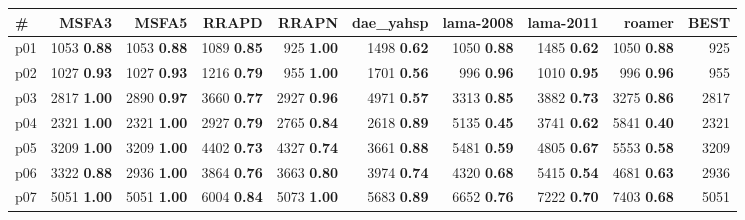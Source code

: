 \begin{tabular}{|l|rrrrrrrr|r|}
\hline
\textbf{\#} & \textbf{MSFA3} & \textbf{MSFA5} & \textbf{RRAPD} & \textbf{RRAPN} & \textbf{dae\_yahsp} & \textbf{lama-2008} & \textbf{lama-2011} & \textbf{roamer} & \textbf{BEST}\\
\hline
p01 & {\footnotesize 1053} \textbf{0.88} & {\footnotesize 1053} \textbf{0.88} & {\footnotesize 1089} \textbf{0.85} & {\footnotesize 925} \textbf{1.00} & {\footnotesize 1498} \textbf{0.62} & {\footnotesize 1050} \textbf{0.88} & {\footnotesize 1485} \textbf{0.62} & {\footnotesize 1050} \textbf{0.88} & 925\\
p02 & {\footnotesize 1027} \textbf{0.93} & {\footnotesize 1027} \textbf{0.93} & {\footnotesize 1216} \textbf{0.79} & {\footnotesize 955} \textbf{1.00} & {\footnotesize 1701} \textbf{0.56} & {\footnotesize 996} \textbf{0.96} & {\footnotesize 1010} \textbf{0.95} & {\footnotesize 996} \textbf{0.96} & 955\\
p03 & {\footnotesize 2817} \textbf{1.00} & {\footnotesize 2890} \textbf{0.97} & {\footnotesize 3660} \textbf{0.77} & {\footnotesize 2927} \textbf{0.96} & {\footnotesize 4971} \textbf{0.57} & {\footnotesize 3313} \textbf{0.85} & {\footnotesize 3882} \textbf{0.73} & {\footnotesize 3275} \textbf{0.86} & 2817\\
p04 & {\footnotesize 2321} \textbf{1.00} & {\footnotesize 2321} \textbf{1.00} & {\footnotesize 2927} \textbf{0.79} & {\footnotesize 2765} \textbf{0.84} & {\footnotesize 2618} \textbf{0.89} & {\footnotesize 5135} \textbf{0.45} & {\footnotesize 3741} \textbf{0.62} & {\footnotesize 5841} \textbf{0.40} & 2321\\
p05 & {\footnotesize 3209} \textbf{1.00} & {\footnotesize 3209} \textbf{1.00} & {\footnotesize 4402} \textbf{0.73} & {\footnotesize 4327} \textbf{0.74} & {\footnotesize 3661} \textbf{0.88} & {\footnotesize 5481} \textbf{0.59} & {\footnotesize 4805} \textbf{0.67} & {\footnotesize 5553} \textbf{0.58} & 3209\\
p06 & {\footnotesize 3322} \textbf{0.88} & {\footnotesize 2936} \textbf{1.00} & {\footnotesize 3864} \textbf{0.76} & {\footnotesize 3663} \textbf{0.80} & {\footnotesize 3974} \textbf{0.74} & {\footnotesize 4320} \textbf{0.68} & {\footnotesize 5415} \textbf{0.54} & {\footnotesize 4681} \textbf{0.63} & 2936\\
p07 & {\footnotesize 5051} \textbf{1.00} & {\footnotesize 5051} \textbf{1.00} & {\footnotesize 6004} \textbf{0.84} & {\footnotesize 5073} \textbf{1.00} & {\footnotesize 5683} \textbf{0.89} & {\footnotesize 6652} \textbf{0.76} & {\footnotesize 7222} \textbf{0.70} & {\footnotesize 7403} \textbf{0.68} & 5051\\

\end{tabular}
